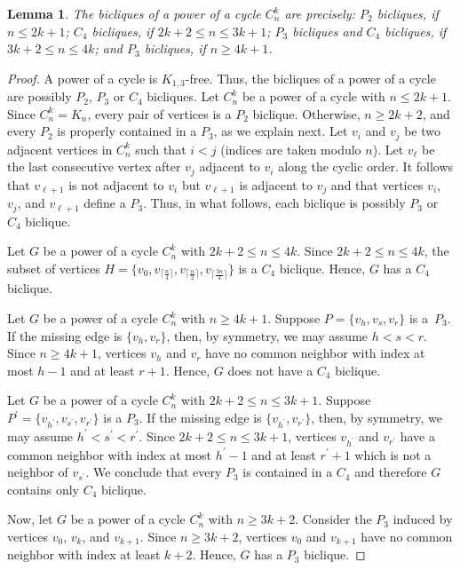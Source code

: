 \documentclass{article}
\newtheorem{lemma}[theorem]{Lemma}
\begin{document}
\begin{lemma}
\label{lem:powerofcyclesbicliques}
 The bicliques of a power of a cycle $C_n^k$ are precisely:
  $P_{2}$ bicliques, if $n \leq 2k + 1$;
  $C_4$ bicliques, if $2k + 2 \leq n \leq 3k + 1$;
  $P_{3}$ bicliques and $C_4$ bicliques, if $3k + 2 \leq n \leq 4k$; and
  $P_{3}$ bicliques, if $n \geq 4k + 1$.
\end{lemma}
\begin{proof}
A power of a cycle is $K_{1, 3}$-free. Thus, the bicliques of a power of a cycle
are possibly $P_{2}$, $P_{3}$ or $C_4$ bicliques. Let $C_{n}^{k}$ be a
power of a cycle with $n \leq 2k + 1$. Since $C_n^k = K_n$, every pair of
vertices is a $P_2$ biclique. Otherwise, $n \geq 2k + 2$, and every $P_{2}$ is
properly contained in a $P_{3}$, as we explain next. Let $v_i$ and $v_j$ be two
adjacent vertices in $C_n^k$ such that $i < j$ (indices are taken modulo $n$). Let $v_\ell$ be
the last consecutive vertex after $v_j$ adjacent to $v_i$ along the cyclic
order. It follows that $v_{\ell + 1}$ is not adjacent to $v_i$ but $v_{\ell +
1}$ is adjacent to $v_j$ and that vertices $v_i$, $v_j$, and $v_{\ell + 1}$ define a
$P_3$. Thus, in what follows, each biclique is possibly $P_{3}$ or $C_4$
biclique.

Let $G$ be a power of a cycle $C_{n}^{k}$ with $2k + 2 \leq n \leq 4k$. 
Since $2k + 2 \leq n \leq 4k$, the subset of vertices $H = \{v_0,
v_{\lceil\frac{n}{4} \rceil}, v_{\lceil\frac{n}{2} \rceil},
v_{\lceil\frac{3n}{4} \rceil}\}$ is a $C_4$ biclique. Hence, $G$ has a $C_4$
biclique.

Let $G$ be a power of a cycle $C_{n}^{k}$ with $n \geq 4k + 1$. 
Suppose $P = \{v_{h}, v_{s}, v_{r}\}$ is a~$P_{3}$. If the missing edge is
$\{v_h, v_r\}$, then, by symmetry, we may assume $h < s < r$.
Since $n \geq 4k + 1$, vertices $v_h$ and $v_{r}$ have no common
neighbor with index at most $h - 1$ and at least $r + 1$. Hence, $G$ does not
have a $C_4$ biclique.

Let $G$ be a power of a cycle $C_{n}^{k}$ with $2k + 2 \leq n \leq 3k+1$.
Suppose $P^\prime = \{v_{h^\prime}, v_{s^\prime}, v_{r^\prime}\}$ is a $P_{3}$.
If the missing edge is $\{v_{h^\prime}, v_{r^\prime}\}$, then, by symmetry, we may
assume $h^\prime < s^\prime < r^\prime$. Since $2k + 2 \leq n \leq 3k + 1$,
vertices $v_{h^\prime}$ and $v_{r^\prime}$ have a common neighbor with index at most
$h^\prime - 1$ and at least $r^\prime + 1$ which is not a neighbor of
$v_{s^\prime}$. We conclude that every $P_3$ is contained in a $C_4$ and 
therefore $G$ contains only $C_4$ biclique.

Now, let $G$ be a power of a cycle $C_{n}^{k}$ with $n \geq 3k + 2$. Consider
the $P_{3}$ induced by vertices $v_0$, $v_k$, and $v_{k+1}$. Since $n \geq 3k +
2$, vertices $v_0$ and $v_{k+1}$ have no common neighbor with index at least
$k+2$. Hence, $G$ has a $P_3$ biclique.
\end{proof}
\end{document}
